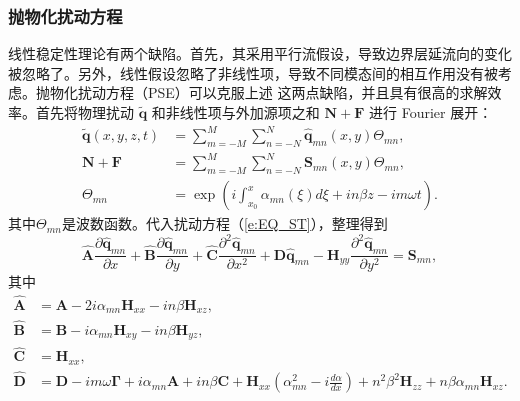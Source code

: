 \subsubsection{抛物化扰动方程}
线性稳定性理论有两个缺陷。首先，其采用平行流假设，导致边界层延流向的变化被忽略了。另外，线性假设忽略了非线性项，导致不同模态间的相互作用没有被考虑。抛物化扰动方程（PSE）可以克服上述 这两点缺陷，并且具有很高的求解效率。首先将物理扰动 $\mathbf{\tilde{q}}$ 和非线性项与外加源项之和 $\mathbf{{N}}+\mathbf{{F}}$ 进行 Fourier 展开：
\begin{align}
\label{e:Fourier1}
    {\mathbf{\tilde q}}\left( {x,y,z,t} \right)& = \sum\limits_{m =  - M}^M {\sum\limits_{n =  - N}^N {{\mathbf{\hat q}}_{mn} \left( {x,y} \right)\Theta _{mn} } },\\
\label{e:Fourier2}
    {\mathbf{N}} + {\mathbf{F}} &= \sum\limits_{m =  - M}^M {\sum\limits_{n =  - N}^N {{\mathbf{S}}_{mn} \left( {x,y} \right)\Theta _{mn} } },\\
\label{e:Fourier3}
    \Theta _{mn}  &= \exp \!\left( {i\int_{x_0 }^x {\alpha _{mn} \left( \xi  \right)d\xi }  + in\beta z - im\omega t} \right).
\end{align}
其中$\Theta _{mn}$是波数函数。代入扰动方程（\ref{e:EQ_ST}），整理得到
\begin{equation}
\label{e:unPSE}
    {\mathbf{\hat A}}\frac{{\partial {\mathbf{\hat q}}_{mn} }}{{\partial x}}
  + {\mathbf{\hat B}}\frac{{\partial {\mathbf{\hat q}}_{mn} }}{{\partial y}}
  + {\mathbf{\hat C}}\frac{{\partial^2 {\mathbf{\hat q}}_{mn} }}{{\partial x^2}}
  + {\mathbf{\hat D\hat q}}_{mn}
  - {\mathbf{H}}_{yy}\frac{{\partial ^2 {\mathbf{\hat q}}_{mn} }}{{\partial y^2 }}
  = {\mathbf{S}}_{mn},
\end{equation}
其中
\begin{equation}
\begin{aligned}
  \mathbf{\hat A} & = {\mathbf{A}} - 2i\alpha_{mn}{\mathbf{H}}_{xx} - in\beta{\mathbf{H}}_{xz}  , \\
  \mathbf{\hat B} & = {\mathbf{B}} -  i\alpha_{mn}{\mathbf{H}}_{xy} - in\beta{\mathbf{H}}_{yz}   , \\
  \mathbf{\hat C} & = {\mathbf{H}}_{xx} , \\
  \mathbf{\hat D}  &= {\mathbf{D}} - im\omega {\mathbf{\Gamma }} + i\alpha_{mn} {\mathbf{A}} + in\beta {\mathbf{C}} + {\mathbf{H}}_{xx} \left( {\alpha_{mn}^2  - i\frac{{d\alpha }}{dx}} \right) + n^2\beta ^2 {\mathbf{H}}_{zz} + n\beta\alpha_{mn}{\mathbf{H}}_{xz} . \\
\end{aligned}
\end{equation}
